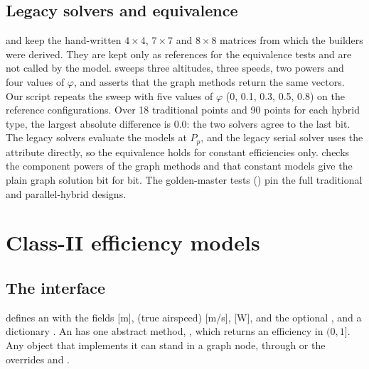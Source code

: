 \documentclass[a4paper,11pt]{article}
\begin{document}
\subsection{Legacy solvers and equivalence}\label{sec:legacy}
 and  keep the
hand-written $4\times4$, $7\times7$ and $8\times8$ matrices from which the builders were
derived. They are kept only as references for the equivalence tests and are not called by
the model.  sweeps three altitudes,
three speeds, two powers and four values of $\varphi$, and asserts that the graph methods
return the same vectors. Our script repeats the sweep with five values of $\varphi$ (0, 0.1,
0.3, 0.5, 0.8) on the reference configurations. Over 18 traditional points and 90 points
for each hybrid type, the largest absolute difference is 0.0: the two solvers agree to the
last bit. The legacy solvers evaluate the models at $P_p$, and the legacy serial solver
uses the attribute  directly, so the equivalence holds for constant efficiencies
only.  checks the component powers
of the graph methods and that constant models give the plain graph solution bit for bit. The golden-master tests
() pin the full traditional and parallel-hybrid
designs.

\section{Class-II efficiency models}\label{sec:class2}

\subsection{The interface}
 defines an  with the fields  [m],
 (true airspeed) [m/s],  [W], and the optional ,
 and a dictionary . An  has one abstract
method, , which returns an efficiency in $(0, 1]$. Any object that implements
it can stand in a graph node, through  or the overrides
 and .
\end{document}
